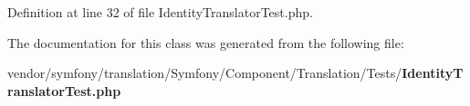 Definition at line 32 of file Identity\+Translator\+Test.\+php.



The documentation for this class was generated from the following file\+:\begin{DoxyCompactItemize}
\item 
vendor/symfony/translation/\+Symfony/\+Component/\+Translation/\+Tests/{\bf Identity\+Translator\+Test.\+php}\end{DoxyCompactItemize}
